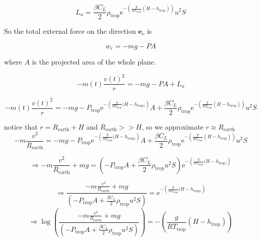 \documentclass{article}
\renewcommand{\vec}[1]{\boldsymbol{#1}}
\begin{document}
\begin{equation}
    L_u= \frac{\beta C_L}{2} \rho_{\text{trop}}\mathrm{e}^{-\left( \frac{g}{RT_{\text{trop}}}(H-h_{\text{trop}}) \right)} u^2S
\end{equation}

So the total external force on the direction $\vec{e}_r$ is 

\begin{equation}
    w_r=-mg -PA 
\end{equation}

where $A$ is the projected area of the whole plane.

\begin{equation}
    -m(t)\frac{v(t)^2}{r}=-mg- PA +L_u
\end{equation}

\begin{equation}
     -m(t)\frac{v(t)^2}{r}=-mg-  P_{\text{trop}}\mathrm{e}^{-\left( \frac{g}{RT_{\text{trop}}}(H-h_{\text{trop})} \right)}A +\frac{\beta C_L}{2} \rho_{\text{trop}}\mathrm{e}^{-\left( \frac{g}{RT_{\text{trop}}}(H-h_{\text{trop}}) \right)} u^2S
   \end{equation}

notice that $r=R_{\text{earth}}+H$ and $R_{\text{earth}}>> H$, so we approximate $r\approx R_{\text{earth}}$
\begin{equation}
    -m\frac{v^2}{R_{\text{earth}}}= -mg-  P_{\text{trop}}\mathrm{e}^{-\left( \frac{g}{RT_{\text{trop}}}(H-h_{\text{trop})} \right)}A +\frac{\beta C_L}{2} \rho_{\text{trop}}\mathrm{e}^{-\left( \frac{g}{RT_{\text{trop}}}(H-h_{\text{trop}}) \right)} u^2S
\end{equation}

\begin{equation}
\Rightarrow     -m\frac{v^2}{R_{\text{earth}}} +mg= \left(-  P_{\text{trop}}A +\frac{\beta C_L}{2} \rho_{\text{trop}} u^2S\right) \mathrm{e}^{-\left( \frac{g}{RT_{\text{trop}}}(H-h_{\text{trop})} \right)}
\end{equation}

\begin{equation}
  \Rightarrow \frac{-m\frac{v^2}{R_{\text{earth}}} +mg}{\left(-  P_{\text{trop}}A +\frac{\beta C_L}{2} \rho_{\text{trop}} u^2S\right)}=  \mathrm{e}^{-\left( \frac{g}{RT_{\text{trop}}}(H-h_{\text{trop})} \right)}    
\end{equation}
\begin{equation}
  \Rightarrow \log \left(\frac{-m\frac{v^2}{R_{\text{earth}}} +mg}{\left(-  P_{\text{trop}}A +\frac{\beta C_L}{2} \rho_{\text{trop}} u^2S\right)}\right)=  -\left( \frac{g}{RT_{\text{trop}}}(H-h_{\text{trop}}) \right)    
\end{equation}
\end{document}
